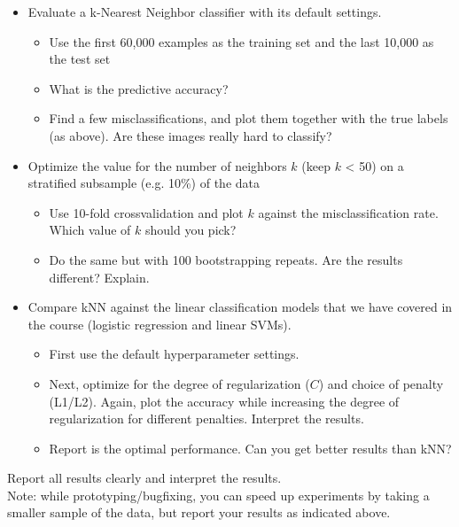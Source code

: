 \documentclass[11pt]{article}
\providecommand{\tightlist}{%
      \setlength{\itemsep}{0pt}\setlength{\parskip}{0pt}}
\begin{document}
    \begin{itemize}
\tightlist
\item
  Evaluate a k-Nearest Neighbor classifier with its default settings.

  \begin{itemize}
  \tightlist
  \item
    Use the first 60,000 examples as the training set and the last
    10,000 as the test set
  \item
    What is the predictive accuracy?
  \item
    Find a few misclassifications, and plot them together with the true
    labels (as above). Are these images really hard to classify?
  \end{itemize}
\item
  Optimize the value for the number of neighbors \(k\) (keep \(k\)
  \textless{} 50) on a stratified subsample (e.g. 10\%) of the data

  \begin{itemize}
  \tightlist
  \item
    Use 10-fold crossvalidation and plot \(k\) against the
    misclassification rate. Which value of \(k\) should you pick?
  \item
    Do the same but with 100 bootstrapping repeats. Are the results
    different? Explain.
  \end{itemize}
\item
  Compare kNN against the linear classification models that we have
  covered in the course (logistic regression and linear SVMs).

  \begin{itemize}
  \tightlist
  \item
    First use the default hyperparameter settings.
  \item
    Next, optimize for the degree of regularization (\(C\)) and choice
    of penalty (L1/L2). Again, plot the accuracy while increasing the
    degree of regularization for different penalties. Interpret the
    results.
  \item
    Report is the optimal performance. Can you get better results than
    kNN?
  \end{itemize}
\end{itemize}

Report all results clearly and interpret the results.\\
Note: while prototyping/bugfixing, you can speed up experiments by
taking a smaller sample of the data, but report your results as
indicated above.
\end{document}
